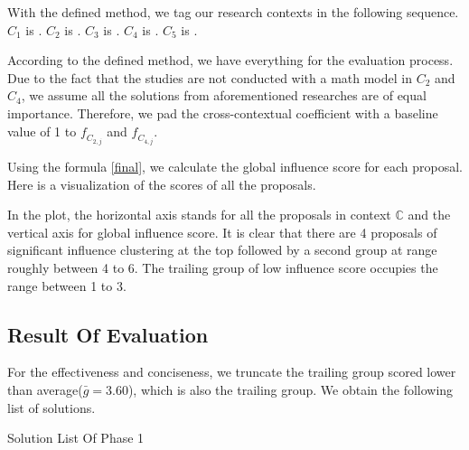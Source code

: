 With the defined method, we tag our research contexts in the following sequence.
$C_{1}$ is .
$C_{2}$ is .
$C_{3}$ is .
$C_{4}$ is .
$C_{5}$ is .

According to the defined method, we have everything for the evaluation process. Due to the fact that the studies are not conducted with a math model in $C_{2}$ and $C_{4}$, we assume all the solutions from aforementioned researches are of equal importance. Therefore, we pad the cross-contextual coefficient with a baseline value of 1 to $\mathit{f_{C_{2,j}}}$ and $\mathit{f_{C_{4,j}}}$.

Using the formula \ref{final}, we calculate the global influence score for each proposal. Here is a visualization of the scores of all the proposals.

\begin{figure}[ht]
\centering
{}
\end{figure}

In the plot, the horizontal axis stands for all the proposals in context $\mathbb{C}$ and the vertical axis for global influence score. It is clear that there are 4 proposals of significant influence clustering at the top followed by a second group at range roughly between 4 to 6. The trailing group of low influence score occupies the range between 1 to 3.

\subsection{Result Of Evaluation}
For the effectiveness and conciseness, we truncate the trailing group scored lower than average($\bar{g}=3.60$), which is also the trailing group. We obtain the following list of solutions.

\begin{table}[ht]
\caption{Solution List Of Phase 1}
\label{tab:solution}
\end{table}

